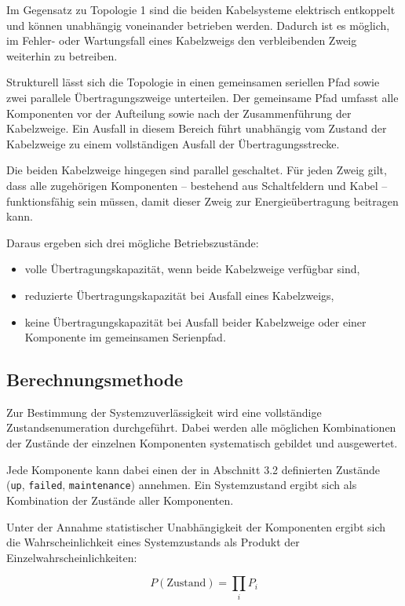 \documentclass[a4paper,12pt]{article}
\begin{document}
Im Gegensatz zu Topologie 1 sind die beiden Kabelsysteme elektrisch
entkoppelt und können unabhängig voneinander betrieben werden. Dadurch
ist es möglich, im Fehler- oder Wartungsfall eines Kabelzweigs den
verbleibenden Zweig weiterhin zu betreiben.

Strukturell lässt sich die Topologie in einen gemeinsamen seriellen Pfad
sowie zwei parallele Übertragungszweige unterteilen. Der gemeinsame Pfad
umfasst alle Komponenten vor der Aufteilung sowie nach der
Zusammenführung der Kabelzweige. Ein Ausfall in diesem Bereich führt
unabhängig vom Zustand der Kabelzweige zu einem vollständigen Ausfall der
Übertragungsstrecke.

Die beiden Kabelzweige hingegen sind parallel geschaltet. Für jeden Zweig
gilt, dass alle zugehörigen Komponenten – bestehend aus Schaltfeldern und
Kabel – funktionsfähig sein müssen, damit dieser Zweig zur
Energieübertragung beitragen kann.

Daraus ergeben sich drei mögliche Betriebszustände:
\begin{itemize}
    \item volle Übertragungskapazität, wenn beide Kabelzweige verfügbar sind,
    \item reduzierte Übertragungskapazität bei Ausfall eines Kabelzweigs,
    \item keine Übertragungskapazität bei Ausfall beider Kabelzweige oder
          einer Komponente im gemeinsamen Serienpfad.
\end{itemize}

\subsection{Berechnungsmethode}

Zur Bestimmung der Systemzuverlässigkeit wird eine vollständige
Zustandsenumeration durchgeführt. Dabei werden alle möglichen
Kombinationen der Zustände der einzelnen Komponenten systematisch
gebildet und ausgewertet.

Jede Komponente kann dabei einen der in Abschnitt 3.2 definierten Zustände
(\texttt{up}, \texttt{failed}, \texttt{maintenance}) annehmen. Ein
Systemzustand ergibt sich als Kombination der Zustände aller Komponenten.

Unter der Annahme statistischer Unabhängigkeit der Komponenten ergibt sich
die Wahrscheinlichkeit eines Systemzustands als Produkt der
Einzelwahrscheinlichkeiten:

\begin{equation}
P(\text{Zustand}) = \prod_i P_i
\end{equation}
\end{document}

